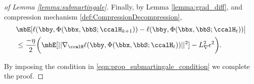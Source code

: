 \begin{proof}[of Lemma \ref{lemma:submartingale}]
 Finally, by Lemma \ref{lemma:grad_diff}, and compression mechanism \ref{def:CompressionDecompression}, 
	\begin{align}
		&\mbE[\ell(\bby,\Phi(\bbx,\bbS;\ccalH_{k+1}))-\ell(\bby,\Phi(\bbx,\bbS;\ccalH_t))]\\
		&\leq  \frac{-\eta}{2}\bigg(\mbE[||\nabla_\ccalH\ell(\bby,\Phi(\bbx,\bbS;\ccalH_t))||^2]-\lipGrad^2\epsilon^2\bigg)\nonumber .
	\end{align}
	
	
	By imposing the condition in \ref{eqn:prop_submartingale_condition} we complete the proof. 
\end{proof}


